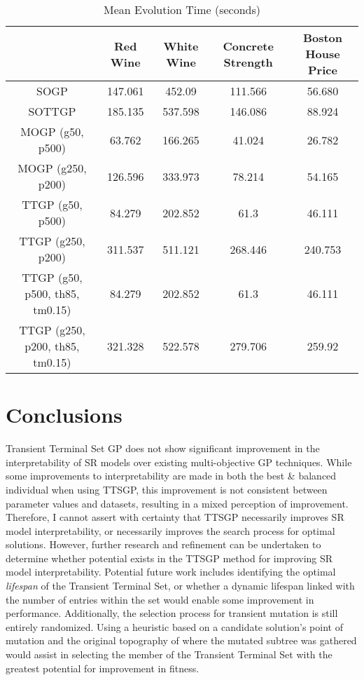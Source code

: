 \documentclass[a4paper, twocolumn]{article}
\begin{document}
\begin{table*}[t]
	\begin{center}
		\caption{Mean Evolution Time (seconds)}
		\label{table:4}
		\begin{tabular}{ c|cccc }
			& Red Wine & White Wine & Concrete Strength & Boston House Price\\
			\hline
			SOGP &147.061&452.09&111.566&56.680\\
			SOTTGP &185.135&537.598&146.086&88.924\\
			MOGP (g50, p500) &63.762&166.265&41.024&26.782\\
			MOGP (g250, p200) &126.596&333.973&78.214&54.165\\
			TTGP (g50, p500) &84.279&202.852&61.3&46.111\\
			TTGP (g250, p200) &311.537&511.121&268.446&240.753\\
			TTGP (g50, p500, th85, tm0.15) &84.279&202.852&61.3&46.111\\
			TTGP (g250, p200, th85, tm0.15) &321.328&522.578&279.706&259.92\\
		\end{tabular}
	\end{center}
\end{table*}

\section{Conclusions}
Transient Terminal Set GP does not show significant improvement in the interpretability of SR models over existing multi-objective GP techniques. While some improvements to interpretability are made in both the best \& balanced individual when using TTSGP, this improvement is not consistent between parameter values and datasets, resulting in a mixed perception of improvement. Therefore, I cannot assert with certainty that TTSGP necessarily improves SR model interpretability, or necessarily improves the search process for optimal solutions.
\newline
However, further research and refinement can be undertaken to determine whether potential exists in the TTSGP method for improving SR model interpretability. Potential future work includes identifying the optimal \textit{lifespan} of the Transient Terminal Set, or whether a dynamic lifespan linked with the number of entries within the set would enable some improvement in performance. Additionally, the selection process for transient mutation is still entirely randomized. Using a heuristic based on a candidate solution's point of mutation and the original topography of where the mutated subtree was gathered would assist in selecting the member of the Transient Terminal Set with the greatest potential for improvement in fitness.
\medskip
\printbibliography
\end{document}
